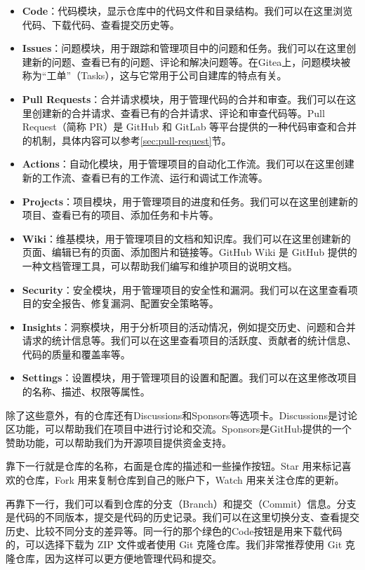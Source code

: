 \begin{itemize}
  \item \textbf{Code}：代码模块，显示仓库中的代码文件和目录结构。我们可以在这里浏览代码、下载代码、查看提交历史等。
  \item \textbf{Issues}：问题模块，用于跟踪和管理项目中的问题和任务。我们可以在这里创建新的问题、查看已有的问题、评论和解决问题等。在Gitea上，问题模块被称为“工单”（Tasks），这与它常用于公司自建库的特点有关。
  \item \textbf{Pull Requests}：合并请求模块，用于管理代码的合并和审查。我们可以在这里创建新的合并请求、查看已有的合并请求、评论和审查代码等。Pull Request（简称 PR）是 GitHub 和 GitLab 等平台提供的一种代码审查和合并的机制，具体内容可以参考\ref{sec:pull-request}节。
  \item \textbf{Actions}：自动化模块，用于管理项目的自动化工作流。我们可以在这里创建新的工作流、查看已有的工作流、运行和调试工作流等。
  \item \textbf{Projects}：项目模块，用于管理项目的进度和任务。我们可以在这里创建新的项目、查看已有的项目、添加任务和卡片等。
  \item \textbf{Wiki}：维基模块，用于管理项目的文档和知识库。我们可以在这里创建新的页面、编辑已有的页面、添加图片和链接等。GitHub Wiki 是 GitHub 提供的一种文档管理工具，可以帮助我们编写和维护项目的说明文档。
  \item \textbf{Security}：安全模块，用于管理项目的安全性和漏洞。我们可以在这里查看项目的安全报告、修复漏洞、配置安全策略等。
  \item \textbf{Insights}：洞察模块，用于分析项目的活动情况，例如提交历史、问题和合并请求的统计信息等。我们可以在这里查看项目的活跃度、贡献者的统计信息、代码的质量和覆盖率等。
  \item \textbf{Settings}：设置模块，用于管理项目的设置和配置。我们可以在这里修改项目的名称、描述、权限等属性。
\end{itemize}
除了这些意外，有的仓库还有Discussions和Sponsors等选项卡。Discussions是讨论区功能，可以帮助我们在项目中进行讨论和交流。Sponsors是GitHub提供的一个赞助功能，可以帮助我们为开源项目提供资金支持。

靠下一行就是仓库的名称，右面是仓库的描述和一些操作按钮。Star 用来标记喜欢的仓库，Fork 用来复制仓库到自己的账户下，Watch 用来关注仓库的更新。

再靠下一行，我们可以看到仓库的分支（Branch）和提交（Commit）信息。分支是代码的不同版本，提交是代码的历史记录。我们可以在这里切换分支、查看提交历史、比较不同分支的差异等。同一行的那个绿色的Code按钮是用来下载代码的，可以选择下载为 ZIP 文件或者使用 Git 克隆仓库。我们非常推荐使用 Git 克隆仓库，因为这样可以更方便地管理代码和提交。

